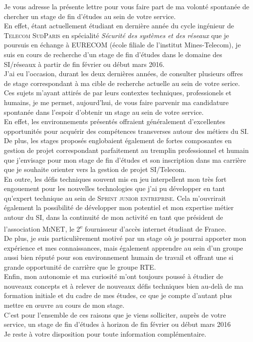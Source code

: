 \documentclass[10pt,a4paper,roman]{moderncv} %
\begin{document}
\quad \quad Je vous adresse la présente lettre pour vous faire part de ma volonté spontanée de chercher un stage de fin d'études au sein de votre
service.\\[0.3cm]
\quad \quad En effet, étant actuellement étudiant en dernière année du cycle ingénieur de \textsc{Telecom SudParis} en spécialité
\textit{Sécurité des systèmes et des réseaux} que je poursuis en échange à EURECOM (école filiale de l'institut Mines-Telecom), je suis en cours
de recherche d'un stage de fin d'études dans le domaine des SI/réseaux à partir de fin février ou début mars 2016.\\[0.3cm]
\quad \quad J'ai eu l'occasion, durant les deux dernières années, de consulter plusieurs offres de stage correspondant à ma cible de recherche actuelle
au sein de votre serice. Ces sujets m'ayant attirés de par leurs contextes techniques, professionels et humains, je me permet, aujourd'hui, de vous
faire parvenir ma candidature spontanée dans l'espoir d'obtenir un stage au sein de votre service.\\
En effet, les environnements présentés offraient généralement d'excellentes opportunités pour acquérir des compétences transverses autour des
métiers du SI. De plus, les stages proposés englobaient également de fortes composantes en gestion de projet correspondant parfaitement au tremplin
professionnel et humain que j’envisage pour mon stage de fin d’études et son inscription dans ma carrière que je souhaite orienter vers la
gestion de projet SI/Telecom.\\
En outre, les défis techniques souvent mis en jeu interpellent mon très fort engouement pour les nouvelles technologies que j'ai pu
développer en tant qu'expert technique au sein de \textsc{Sprint junior entreprise}. Cela m'ouvrirait également la possibilité de développer mon
potentiel et mon expertise métier autour du SI, dans la continuité de mon activité en tant que président de l'association \textsc{MiNET},
le 2\textsuperscript{e} fournisseur d'accès internet étudiant de France.\\
De plus, je suis particulièrement motivé par un stage où je pourrai apporter mon expérience et mes connaissances, mais également
apprendre au sein d'un groupe aussi bien réputé pour son environnement humain de travail et offrant une si grande opportunité
de carrière que le groupe \textsc{RTE}.\\
Enfin, mon autonomie et ma curiosité m'ont toujours poussé à étudier de nouveaux concepts et à relever de nouveaux défis techniques bien au-delà de ma
formation initiale et du cadre de mes études, ce que je compte d'autant plus mettre en \oe uvre au cours de mon stage.\\
C'est pour l'ensemble de ces raisons que je viens solliciter, auprès de votre service, un stage de fin d'études à horizon de fin février
ou début mars 2016\\[0.3cm]
Je reste à votre disposition pour toute information complémentaire. \\[1cm]

\makeletterclosing %

\end{document}
